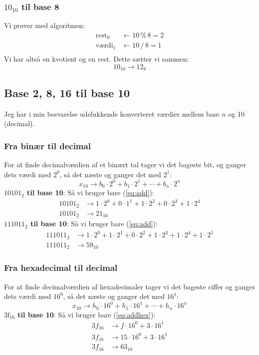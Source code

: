 \documentclass{article}
\begin{document}
\subsubsection*{$10_{10}$ til base 8}
Vi prøver med algoritmen:
\begin{align*}
    \text{rest}_0 & \leftarrow 10\, \%\, 8=2\\
    \text{værdi}_1 & \leftarrow 10\, /\, 8=1\\
\end{align*}
Vi har altså en kvotient og en rest. Dette sætter vi sammen:\begin{equation}
    10_{10}\rightarrow12_8
\end{equation}
\subsection*{Base 2, 8, 16 til base 10}
Jeg har i min besvarelse udelukkende konverteret værdier mellem base $n$ og 10 (decimal).
\subsubsection*{Fra binær til decimal}
For at finde decimalværdien af et binært tal tager vi det bageste bit, og ganger dets værdi med $2^0$, så det næste og ganger det med $2^1$:\begin{equation}
    x_{10}\rightarrow b_0\cdot2^0+b_1\cdot2^1+\cdots+b_n\cdot2^n\label{eq:add}
\end{equation}
\textbf{$10101_2$ til base 10}: Så vi bruger bare (\ref{eq:add}):\begin{align*}
    10101_2&\rightarrow 1\cdot2^0+0\cdot1^1+1\cdot2^2+0\cdot2^3+1\cdot2^4\\
    10101_2&\rightarrow 21_10
\end{align*}
\textbf{$111011_2$ til base 10}: Så vi bruger bare (\ref{eq:add}):\begin{align*}
    111011_2&\rightarrow 1\cdot2^0+1\cdot2^1+0\cdot2^2+1\cdot2^3+1\cdot2^4+1\cdot2^5\\
    111011_2&\rightarrow 59_10
\end{align*}
\subsubsection*{Fra hexadecimal til decimal}
For at finde decimalværdien af hexadecimaler tager vi det bageste ciffer og ganger dets værdi med $16^0$, så det næste og ganger det med $16^1$:\begin{equation}
    x_{10}\rightarrow h_0\cdot16^0+h_1\cdot16^1+\cdots+h_n\cdot16^n\label{eq:addhex}
\end{equation}
\textbf{$3\text{f}_{16}$ til base 10}: Så vi bruger bare (\ref{eq:addhex}):\begin{align*}
    3f_{16}&\rightarrow f\cdot16^0+3\cdot16^1\\
    3f_{16}&\rightarrow 15\cdot16^0+3\cdot16^1\\
    3f_{16}&\rightarrow 63_{10}
\end{align*}
\end{document}
